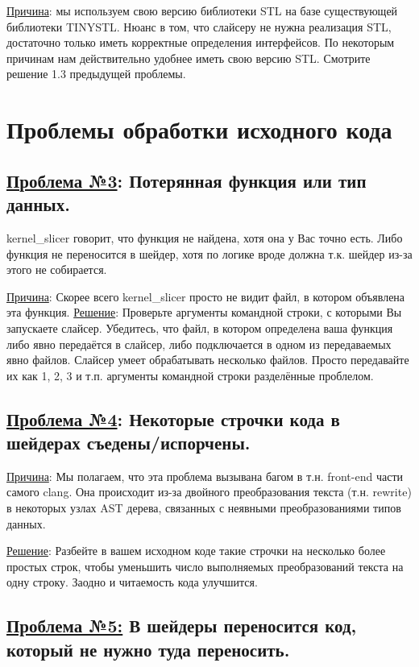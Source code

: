 \documentclass[11pt,fleqn,english,russian]{report} %
\begin{document}
\noindent\underline{Причина}: мы используем свою версию библиотеки STL на базе существующей библиотеки TINYSTL. Нюанс в том, что слайсеру не нужна реализация STL, достаточно только иметь корректные определения интерфейсов. По некоторым причинам нам действительно удобнее иметь свою версию STL. Смотрите решение 1.3 предыдущей проблемы.

\section{Проблемы обработки исходного кода}

\subsection{\underline{Проблема №3}: Потерянная функция или тип данных.} kernel\_slicer говорит, что функция не найдена, хотя она у Вас точно есть. Либо функция не переносится в шейдер, хотя по логике вроде должна т.к. шейдер из-за этого не собирается.

\noindent\underline{Причина}: Скорее всего kernel\_slicer просто не видит файл, в котором объявлена эта функция. \underline{Решение}: Проверьте аргументы командной строки, с которыми Вы запускаете слайсер. Убедитесь, что файл, в котором определена ваша функция либо явно передаётся в слайсер, либо подключается в одном из передаваемых явно файлов. Слайсер умеет обрабатывать несколько файлов. Просто передавайте их как 1, 2, 3 и т.п. аргументы командной строки разделённые проблелом.  

\subsection{\underline{Проблема №4}: Некоторые строчки кода в шейдерах съедены/испорчены.}

\noindent\underline{Причина}: Мы полагаем, что эта проблема вызывана багом в т.н. front-end части самого clang. Она происходит из-за двойного преобразования текста (т.н. rewrite) в некоторых узлах AST дерева, связанных с неявными преобразованиями типов данных. 

\underline{Решение}: Разбейте в вашем исходном коде такие строчки на несколько более простых строк, чтобы уменьшить число выполняемых преобразований текста на одну строку. Заодно и читаемость кода улучшится.

\subsection{\underline{Проблема №5:} В шейдеры переносится код, который не нужно туда переносить.}
\end{document}
